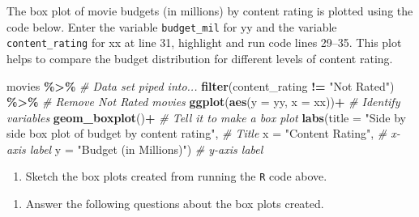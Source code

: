 \documentclass[
]{report}
\newenvironment{Shaded}{\begin{snugshade}}{\end{snugshade}}
\newcommand{\CommentTok}[1]{\textcolor[rgb]{0.56,0.35,0.01}{\textit{#1}}}
\newcommand{\DataTypeTok}[1]{\textcolor[rgb]{0.13,0.29,0.53}{#1}}
\newcommand{\KeywordTok}[1]{\textcolor[rgb]{0.13,0.29,0.53}{\textbf{#1}}}
\newcommand{\NormalTok}[1]{#1}
\newcommand{\OperatorTok}[1]{\textcolor[rgb]{0.81,0.36,0.00}{\textbf{#1}}}
\newcommand{\StringTok}[1]{\textcolor[rgb]{0.31,0.60,0.02}{#1}}
\providecommand{\tightlist}{%
  \setlength{\itemsep}{0pt}\setlength{\parskip}{0pt}}
\begin{document}
The box plot of movie budgets (in millions) by content rating is plotted using the code below. Enter the variable \texttt{budget\_mil} for yy and the variable \texttt{content\_rating} for xx at line 31, highlight and run code lines 29--35. This plot helps to compare the budget distribution for different levels of content rating.

\begin{Shaded}
\begin{Highlighting}[]
\NormalTok{movies }\OperatorTok{\%\textgreater{}\%}\StringTok{  }\CommentTok{\# Data set piped into...}
\StringTok{  }\KeywordTok{filter}\NormalTok{(content\_rating }\OperatorTok{!=}\StringTok{ "Not Rated"}\NormalTok{) }\OperatorTok{\%\textgreater{}\%}\StringTok{ }\CommentTok{\# Remove Not Rated movies}
\StringTok{  }\KeywordTok{ggplot}\NormalTok{(}\KeywordTok{aes}\NormalTok{(}\DataTypeTok{y =}\NormalTok{ yy, }\DataTypeTok{x =}\NormalTok{ xx))}\OperatorTok{+}\StringTok{  }\CommentTok{\# Identify variables}
\StringTok{  }\KeywordTok{geom\_boxplot}\NormalTok{()}\OperatorTok{+}\StringTok{  }\CommentTok{\# Tell it to make a box plot}
\StringTok{  }\KeywordTok{labs}\NormalTok{(}\DataTypeTok{title =} \StringTok{"Side by side box plot of budget by content rating"}\NormalTok{,  }\CommentTok{\# Title}
       \DataTypeTok{x =} \StringTok{"Content Rating"}\NormalTok{,    }\CommentTok{\# x{-}axis label}
       \DataTypeTok{y =} \StringTok{"Budget (in Millions)"}\NormalTok{)  }\CommentTok{\# y{-}axis label}
\end{Highlighting}
\end{Shaded}

\begin{enumerate}
\def\labelenumi{\arabic{enumi}.}
\setcounter{enumi}{12}
\tightlist
\item
  Sketch the box plots created from running the \texttt{R} code above.
\end{enumerate}

\vspace{1.5in}

\begin{enumerate}
\def\labelenumi{\arabic{enumi}.}
\setcounter{enumi}{13}
\tightlist
\item
  Answer the following questions about the box plots created.
\end{enumerate}
\end{document}
